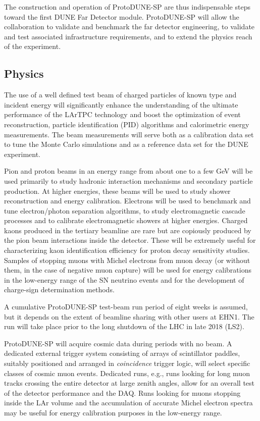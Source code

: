 The construction and operation of ProtoDUNE-SP are thus indispensable steps toward the first DUNE Far Detector module. ProtoDUNE-SP will allow the collaboration to validate and benchmark the far detector engineering, to validate and test associated infrastructure requirements, and to extend the physics reach of the experiment. 


\subsection{Physics}


The use of a well defined test beam of charged particles of known type and incident  energy will significantly enhance the understanding of the ultimate performance of the LArTPC technology and boost the optimization of event reconstruction, particle identification (PID) algorithms and calorimetric energy measurements.  The beam measurements will serve both as a calibration data set to tune the Monte Carlo simulations and as a reference data set for the DUNE experiment. 

Pion and proton beams in an energy range from about one to a few GeV will be used primarily to study hadronic interaction mechanisms and secondary particle production.  At higher energies, these beams will be used to study shower reconstruction and energy calibration. Electrons will be used to benchmark and tune electron/photon separation algorithms, to study electromagnetic cascade processes and to calibrate electromagnetic showers at higher energies. Charged kaons produced in the tertiary beamline are rare but are copiously produced by the pion beam interactions inside the detector. These will be extremely useful for characterizing kaon identification efficiency for proton decay sensitivity studies.  Samples of stopping muons with Michel electrons from muon decay (or without them, in the case of negative muon capture) will be used for energy calibrations in the low-energy range of the SN neutrino events and for the development of charge-sign determination methods. 

A cumulative ProtoDUNE-SP test-beam run period of eight weeks is assumed, but it depends on the extent of beamline sharing with other users at EHN1. The run will take place prior to the long shutdown of the LHC in late 2018 (LS2). 

ProtoDUNE-SP will acquire cosmic data during periods with no beam. A dedicated external trigger system consisting of arrays of scintillator paddles, suitably positioned and arranged in \textit{coincidence} trigger logic, 
will select specific classes of cosmic muon events. Dedicated runs, e.g., runs looking for long muon tracks crossing the entire detector at large zenith angles, allow for an overall test of the detector performance and the DAQ. Runs looking for muons stopping inside the LAr volume and the accumulation of accurate Michel electron spectra may be useful for energy calibration purposes in the low-energy range.


